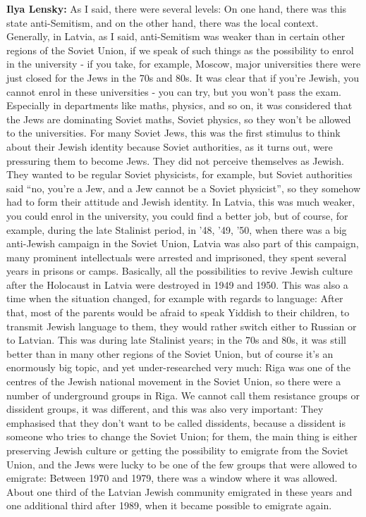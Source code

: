 \textbf{Ilya Lensky:} As I said, there were several levels: On one hand, there was this state anti-Semitism, and on the other hand, there was the local context. Generally, in Latvia, as I said, anti-Semitism was weaker than in certain other regions of the Soviet Union, if we speak of such things as the possibility to enrol in the university - if you take, for example, Moscow, major universities there were just closed for the Jews in the 70s and 80s. It was clear that if you’re Jewish, you cannot enrol in these universities - you can try, but you won’t pass the exam. Especially in departments like maths, physics, and so on, it was considered that the Jews are dominating Soviet maths, Soviet physics, so they won't be allowed to the universities. For many Soviet Jews, this was the first stimulus to think about their Jewish identity because Soviet authorities, as it turns out, were pressuring them to become Jews. They did not perceive themselves as Jewish. They wanted to be regular Soviet physicists, for example, but Soviet authorities said ``no, you’re a Jew, and a Jew cannot be a Soviet physicist'', so they somehow had to form their attitude and Jewish identity. In Latvia, this was much weaker, you could enrol in the university, you could find a better job, but of course, for example, during the late Stalinist period, in '48, '49, '50, when there was a big anti-Jewish campaign in the Soviet Union, Latvia was also part of this campaign, many prominent intellectuals were arrested and imprisoned, they spent several years in prisons or camps. Basically, all the possibilities to revive  Jewish culture after the Holocaust in Latvia were destroyed in 1949 and 1950. This was also a time when the situation changed, for example with regards to language: After that, most of the parents would be afraid to speak Yiddish to their children, to transmit Jewish language to them, they would rather switch either to Russian or to Latvian. This was during late Stalinist years; in the 70s and 80s, it was still better than in many other regions of the Soviet Union, but of course it’s an enormously big topic, and yet under-researched very much: Riga was one of the centres of the Jewish national movement in the Soviet Union, so there were a number of underground groups in Riga. We cannot call them resistance groups or dissident groups, it was different, and this was also very important: They emphasised that they don’t want to be called dissidents, because a dissident is someone who tries to change the Soviet Union; for them, the main thing is either preserving Jewish culture or getting the possibility to emigrate from the Soviet Union, and the Jews were lucky to be one of the few groups that were allowed to emigrate: Between 1970 and 1979, there was a window where it was allowed. About one third of the Latvian Jewish community emigrated in these years and one additional third after 1989, when it became possible to emigrate again. 

